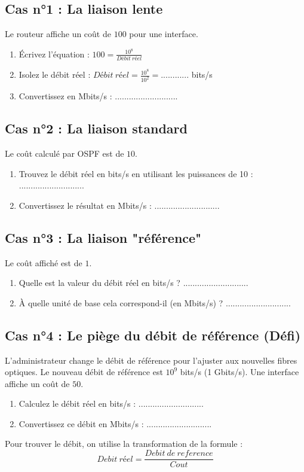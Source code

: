 \subsection*{Cas n°1 : La liaison lente}
Le routeur affiche un coût de $100$ pour une interface.
\begin{enumerate}
    \item Écrivez l'équation : $100 = \frac{10^8}{Débit\ réel}$
    \item Isolez le débit réel : $Débit\ réel = \frac{10^8}{10^2} = ............$ bits/s
    \item Convertissez en Mbits/s : ...........................
\end{enumerate}


\subsection*{Cas n°2 : La liaison standard}
Le coût calculé par OSPF est de $10$.
\begin{enumerate}
    \item Trouvez le débit réel en bits/s en utilisant les puissances de 10 : ............................
    \item Convertissez le résultat en Mbits/s : ............................
\end{enumerate}

\subsection*{Cas n°3 : La liaison "référence"}
Le coût affiché est de $1$.
\begin{enumerate}
    \item Quelle est la valeur du débit réel en bits/s ? ............................
    \item À quelle unité de base cela correspond-il (en Mbits/s) ? ............................
\end{enumerate}

\subsection*{Cas n°4 : Le piège du débit de référence (Défi)}
L'administrateur change le débit de référence pour l'ajuster aux nouvelles fibres optiques. Le nouveau débit de référence est $10^9$ bits/s (1 Gbits/s).
Une interface affiche un coût de $50$.
\begin{enumerate}
    \item  Calculez le débit réel en bits/s : ............................
    \item Convertissez ce débit en Mbits/s : ............................
\end{enumerate}

\begin{Comprendre}
    Pour trouver le débit, on utilise la transformation de la formule :
$$Debit\ réel = \frac{Debit\ de\ reference}{Cout}$$
\end{Comprendre}
